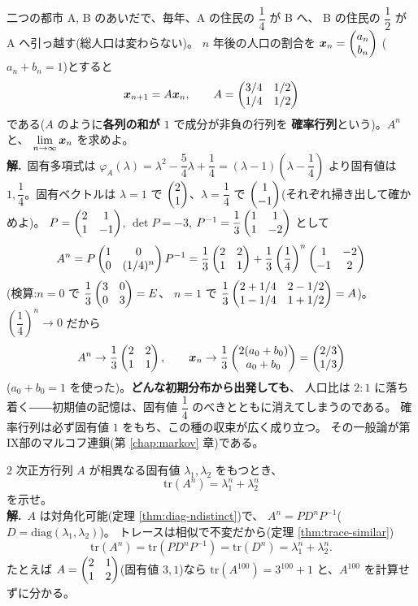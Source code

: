 \begin{rei}\label{rei:power-markov}
二つの都市 A, B のあいだで、毎年、A の住民の $\dfrac{1}{4}$ が B へ、
B の住民の $\dfrac{1}{2}$ が A へ引っ越す(総人口は変わらない)。
$n$ 年後の人口の割合を $\bm{x}_n = \begin{pmatrix}a_n \\ b_n\end{pmatrix}$
($a_n + b_n = 1$)とすると
\[
\bm{x}_{n+1} = A\bm{x}_n, \qquad
A = \begin{pmatrix}3/4 & 1/2 \\ 1/4 & 1/2\end{pmatrix}
\]
である($A$ のように\textbf{各列の和が $1$} で成分が非負の行列を
\textbf{確率行列}という)。$A^n$ と、
$\displaystyle\lim_{n\to\infty}\bm{x}_n$ を求めよ。\\
\textbf{解.}\ 固有多項式は
$\varphi_A(\lambda) = \lambda^2 - \dfrac{5}{4}\lambda + \dfrac{1}{4}
= (\lambda - 1)\left(\lambda - \dfrac{1}{4}\right)$ より固有値は
$1, \dfrac{1}{4}$。固有ベクトルは
$\lambda = 1$ で $\begin{pmatrix}2 \\ 1\end{pmatrix}$、$\lambda = \dfrac{1}{4}$ で
$\begin{pmatrix}1 \\ -1\end{pmatrix}$(それぞれ掃き出して確かめよ)。
$P = \begin{pmatrix}2 & 1 \\ 1 & -1\end{pmatrix}$, $\det P = -3$,
$P^{-1} = \dfrac{1}{3}\begin{pmatrix}1 & 1 \\ 1 & -2\end{pmatrix}$ として
\[
A^n = P\begin{pmatrix}1 & 0 \\ 0 & (1/4)^n\end{pmatrix}P^{-1}
= \frac{1}{3}\begin{pmatrix}2 & 2 \\ 1 & 1\end{pmatrix}
+ \frac{1}{3}\left(\frac{1}{4}\right)^n \begin{pmatrix}1 & -2 \\ -1 & 2\end{pmatrix}
\]
(検算:$n = 0$ で $\dfrac{1}{3}\begin{pmatrix}3 & 0 \\ 0 & 3\end{pmatrix} = E$、
$n = 1$ で $\dfrac{1}{3}\begin{pmatrix}2 + 1/4 & 2 - 1/2 \\ 1 - 1/4 & 1 + 1/2\end{pmatrix}
= A$)。$\left(\dfrac{1}{4}\right)^n \to 0$ だから
\[
A^n \to \frac{1}{3}\begin{pmatrix}2 & 2 \\ 1 & 1\end{pmatrix}, \qquad
\bm{x}_n \to \frac{1}{3}\begin{pmatrix}2(a_0 + b_0) \\ a_0 + b_0\end{pmatrix}
= \begin{pmatrix}2/3 \\ 1/3\end{pmatrix}
\]
($a_0 + b_0 = 1$ を使った)。\textbf{どんな初期分布から出発しても}、
人口比は $2 : 1$ に落ち着く――初期値の記憶は、固有値
$\dfrac{1}{4}$ のべきとともに消えてしまうのである。
確率行列は必ず固有値 $1$ をもち、この種の収束が広く成り立つ。
その一般論が第IX部のマルコフ連鎖(第 \ref{chap:markov} 章)である。
\end{rei}

\begin{rei}[例題・標準(証明:トレースと固有値のべき)]\label{rei:power-trace}
$2$ 次正方行列 $A$ が相異なる固有値 $\lambda_1, \lambda_2$ をもつとき、
\[
\mathrm{tr}(A^n) = \lambda_1^n + \lambda_2^n
\]
を示せ。\\
\textbf{解.}\ $A$ は対角化可能(定理 \ref{thm:diag-ndistinct})で、
$A^n = PD^nP^{-1}$($D = \mathrm{diag}(\lambda_1, \lambda_2)$)。
トレースは相似で不変だから(定理 \ref{thm:trace-similar})
\[
\mathrm{tr}(A^n) = \mathrm{tr}(PD^nP^{-1}) = \mathrm{tr}(D^n)
= \lambda_1^n + \lambda_2^n.
\]
たとえば $A = \begin{pmatrix}2 & 1 \\ 1 & 2\end{pmatrix}$(固有値 $3, 1$)なら
$\mathrm{tr}(A^{100}) = 3^{100} + 1$ と、$A^{100}$ を計算せずに分かる。
\end{rei}

